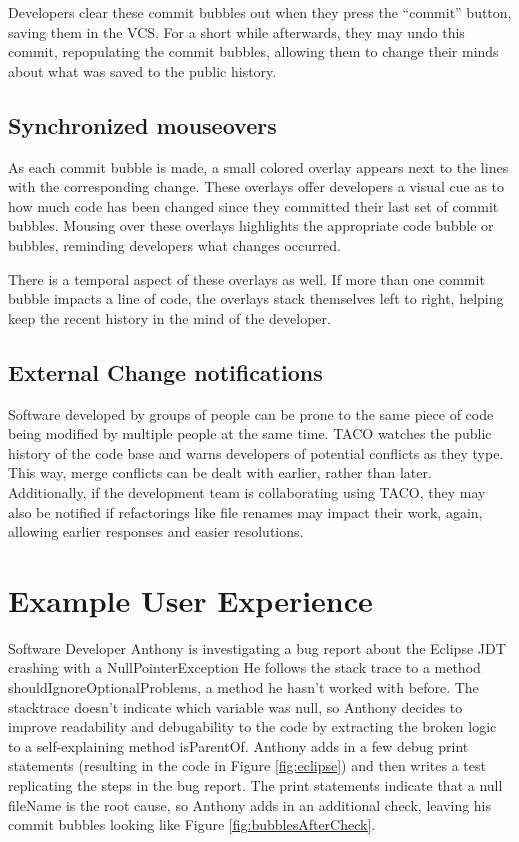 \documentclass[conference]{IEEEtran}
\begin{document}
Developers clear these commit bubbles out when they press the ``commit'' button, saving them in the VCS.  
For a short while afterwards, they may undo this commit, repopulating the commit bubbles, allowing them to change their minds about what was saved to the public history.
\subsection{Synchronized mouseovers}
As each commit bubble is made, a small colored overlay appears next to the lines with the corresponding change.
These overlays offer developers a visual cue as to how much code has been changed since they 
committed their last set of commit bubbles.
Mousing over these overlays highlights the appropriate code bubble or bubbles,
reminding developers what changes occurred.

There is a temporal aspect of these overlays as well.
If more than one commit bubble impacts a line of code, the overlays stack
themselves left to right, helping keep the recent history in the mind of 
the developer.

\subsection{External Change notifications}
Software developed by groups of people can be prone to the same piece of code
being modified by multiple people at the same time.
TACO watches the public history of the code base and warns developers
of potential conflicts as they type.  
This way, merge conflicts can be dealt with earlier, rather than later.
Additionally, if the development team is collaborating using TACO, they
may also be notified if refactorings like file renames may impact their work, again, allowing earlier responses and easier resolutions.

\section{Example User Experience}
Software Developer Anthony is investigating a bug report about the Eclipse JDT crashing with a NullPointerException
He follows the stack trace to a method shouldIgnoreOptionalProblems, a method he hasn't worked with before.
The stacktrace doesn't indicate which variable was null, so Anthony decides to improve readability and debugability 
to the code by extracting the broken logic to a self-explaining method isParentOf.
Anthony adds in a few debug print statements (resulting in the code in Figure \ref{fig:eclipse}) and then writes a test replicating 
the steps in the bug report.
The print statements indicate that a null fileName is the root cause, so Anthony adds in an additional check,
leaving his commit bubbles looking like Figure \ref{fig:bubblesAfterCheck}.
\end{document}
